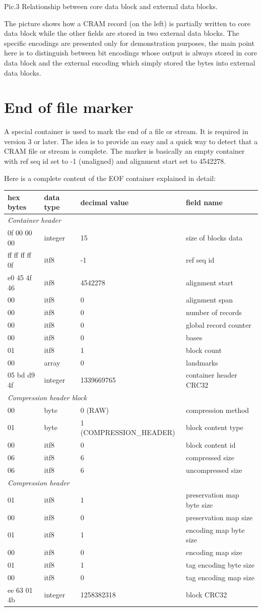 \documentclass[a4paper]{article}
\begin{document}
Pic.3 Relationship between core data block and external data blocks.

The picture shows how a CRAM record (on the left) is partially written to core 
data block while the other fields are stored in two external data blocks. The specific 
encodings are presented only for demonstration purposes, the main point here is 
to distinguish between bit encodings whose output is always stored in core data 
block and the external encoding which simply stored the bytes into external data 
blocks.

\section{\textbf{End of file marker}}

A special container is used to mark the end of a file or stream. It is required in version 3 or later. The idea is to provide an easy and a quick way to detect that a CRAM file or stream is complete. The marker is basically an empty container with ref seq id set to -1 (unaligned) and alignment 
start set to 4542278.

Here is a complete content of the EOF container explained in detail:

\begin{tabular}{|l|l|>{\raggedright}p{150pt}|>{\raggedright}p{180pt}|}
\hline
\textbf{hex bytes} & \textbf{data type} & \textbf{decimal value} & \textbf{field 
name}\tabularnewline
\hline
\multicolumn{4}{|l|}{\textit{Container header}}\tabularnewline
\hline
0f 00 00 00 & integer & 15 & size of blocks data\tabularnewline
\hline
ff ff ff ff 0f & itf8 & -1 & ref seq id\tabularnewline
\hline
e0 45 4f 46 & itf8 & 4542278 & alignment start\tabularnewline
\hline
00 & itf8 & 0 & alignment span\tabularnewline
\hline
00 & itf8 & 0 & number of records\tabularnewline
\hline
00 & itf8 & 0 & global record counter\tabularnewline
\hline
00 & itf8 & 0 & bases\tabularnewline
\hline
01 & itf8 & 1 & block count\tabularnewline
\hline
00 & array & 0 & landmarks\tabularnewline
\hline
05 bd d9 4f & integer & 1339669765 & container header CRC32\tabularnewline
\hline
\multicolumn{4}{|l|}{\textit{Compression header block}}\tabularnewline
\hline
00 & byte & 0 (RAW) & compression method\tabularnewline
\hline
01 & byte & 1 (COMPRESSION\_HEADER) & block content type\tabularnewline
\hline
00 & itf8 & 0 & block content id\tabularnewline
\hline
06 & itf8 & 6 & compressed size\tabularnewline
\hline
06 & itf8 & 6 & uncompressed size\tabularnewline
\hline
\multicolumn{4}{|l|}{\textit{Compression header}}\tabularnewline
\hline
01 & itf8 & 1 & preservation map byte size\tabularnewline
\hline
00 & itf8 & 0 & preservation map size\tabularnewline
\hline
01 & itf8 & 1 & encoding map byte size\tabularnewline
\hline
00 & itf8 & 0 & encoding map size\tabularnewline
\hline
01 & itf8 & 1 & tag encoding byte size\tabularnewline
\hline
00 & itf8 & 0 & tag encoding map size\tabularnewline
\hline
ee 63 01 4b & integer & 1258382318 & block CRC32\tabularnewline
\hline
\end{tabular}
\end{document}
